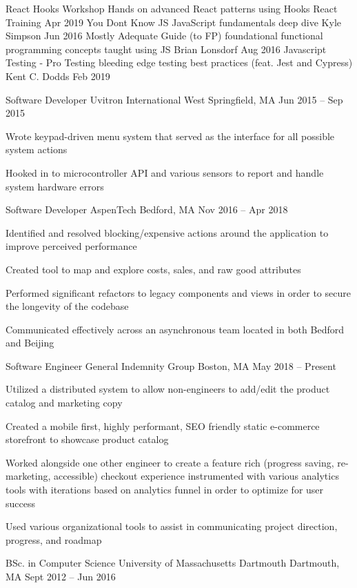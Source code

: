\documentclass[]{awesome-cv}
\begin{document}
\vspace{-7mm}
\begin{cvhonors}
	\cvhonor
	{React Hooks Workshop}
	{Hands on advanced React patterns using Hooks}
	{React Training}
	{Apr 2019}
	\cvhonor
	{You Don\textquotesingle{}t Know JS}
	{JavaScript fundamentals deep dive}
	{Kyle Simpson}
	{Jun 2016}
	\cvhonor
	{Mostly Adequate Guide (to FP)}
	{foundational functional programming concepts taught using JS}
	{Brian Lonsdorf}
	{Aug 2016}
	\cvhonor
	{Javascript Testing - Pro Testing}
	{bleeding edge testing best practices (feat. Jest and Cypress)}
	{Kent C. Dodds}
	{Feb 2019}
\end{cvhonors}
\begin{cventries}
	\cventry
	{Software Developer}
	{Uvitron International}
	{West Springfield, MA}
	{Jun 2015 – Sep 2015}
	{\begin{cvitems}
		\item {Wrote keypad-driven menu system that served as the interface for all possible system actions}
		\item {Hooked in to microcontroller API and various sensors to report and handle system hardware errors}
		\end{cvitems}}
	\cventry
	{Software Developer}
	{AspenTech}
	{Bedford, MA}
	{Nov 2016 – Apr 2018}
	{\begin{cvitems}
		\item {Identified and resolved blocking/expensive actions around the application to improve perceived performance}
		\item {Created tool to map and explore costs, sales, and raw good attributes}
		\item {Performed significant refactors to legacy components and views in order to secure the longevity of the codebase}
		\item {Communicated effectively across an asynchronous team located in both Bedford and Beijing}
		\end{cvitems}}
	\cventry
	{Software Engineer}
	{General Indemnity Group}
	{Boston, MA}
	{May 2018 – Present}
	{\begin{cvitems}
		\item {Utilized a distributed system to allow non-engineers to add/edit the product catalog and marketing copy}
		\item {Created a mobile first, highly performant, SEO friendly static e-commerce storefront to showcase product catalog}
		\item {Worked alongside one other engineer to create a feature rich (progress saving, re-marketing, accessible) checkout experience instrumented with various analytics tools with iterations based on analytics funnel in order to optimize for user success}
		\item {Used various organizational tools to assist in communicating project direction, progress, and roadmap}
		\end{cvitems}}
\end{cventries}
\begin{cventries}
	\cventry
	{BSc. in Computer Science}
	{University of Massachusetts Dartmouth}
	{Dartmouth, MA}
	{Sept 2012 – Jun 2016}
	{}
\end{cventries}

\vspace{-2mm}
\ 
\end{document}
